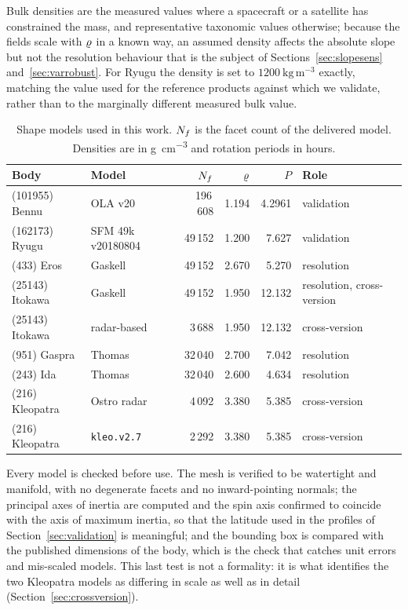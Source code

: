 Bulk densities are the measured values where a spacecraft or a satellite has
constrained the mass, and representative taxonomic values otherwise; because
the fields scale with $\varrho$ in a known way, an assumed density affects the
absolute slope but not the resolution behaviour that is the subject of
Sections~\ref{sec:slopesens} and~\ref{sec:varrobust}. For Ryugu the density is
set to $1200\ \mathrm{kg\,m^{-3}}$ exactly, matching the value used for the
reference products against which we validate, rather than to the marginally
different measured bulk value.

\begin{table}[t]
\centering
\small
\caption{Shape models used in this work. $N_{f}$ is the facet count of the
delivered model. Densities are in \si{\gram\per\cubic\centi\metre} and
rotation periods in hours.}
\label{tab:shapes}
\begin{tabular}{llrrrl}
\toprule
Body & Model & $N_{f}$ & $\varrho$ & $P$ & Role \\
\midrule
(101955) Bennu     & OLA v20            & 196\,608 & 1.194 & 4.2961  & validation \\
(162173) Ryugu     & SFM 49k v20180804  &  49\,152 & 1.200 & 7.627   & validation \\
(433) Eros         & Gaskell            &  49\,152 & 2.670 & 5.270   & resolution \\
(25143) Itokawa    & Gaskell            &  49\,152 & 1.950 & 12.132  & resolution, cross-version \\
(25143) Itokawa    & radar-based        &   3\,688 & 1.950 & 12.132  & cross-version \\
(951) Gaspra       & Thomas             &  32\,040 & 2.700 & 7.042   & resolution \\
(243) Ida          & Thomas             &  32\,040 & 2.600 & 4.634   & resolution \\
(216) Kleopatra    & Ostro radar        &   4\,092 & 3.380 & 5.385   & cross-version \\
(216) Kleopatra    & \texttt{kleo.v2.7} &   2\,292 & 3.380 & 5.385   & cross-version \\
\bottomrule
\end{tabular}
\end{table}

Every model is checked before use. The mesh is verified to be watertight and
manifold, with no degenerate facets and no inward-pointing normals; the
principal axes of inertia are computed and the spin axis confirmed to coincide
with the axis of maximum inertia, so that the latitude used in the profiles of
Section~\ref{sec:validation} is meaningful; and the bounding box is compared
with the published dimensions of the body, which is the check that catches unit
errors and mis-scaled models. This last test is not a formality: it is what
identifies the two Kleopatra models as differing in scale as well as in detail
(Section~\ref{sec:crossversion}).

